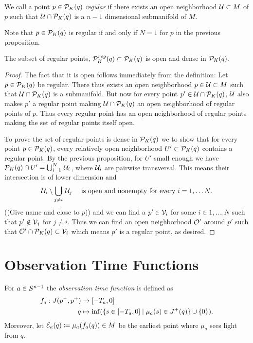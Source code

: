 \begin{definition}\label{def:regpt}
We call a point $p\in {\mathcal{P}}_K(q)$ \emph{regular} if there exists an open neighborhood ${\mathcal{U}}\subset M$ of $p$ such that ${\mathcal{U}}\cap {\mathcal{P}}_K(q)$ is a $n-1$ dimensional submanifold of $M$.

Note that $p\in {\mathcal{P}}_K(q)$ is regular if and only if $N=1$ for $p$ in the previous proposition.
\end{definition}


\begin{corollary}\label{cor:opendense}
    The subset of regular points, ${\mathcal{P}}^{reg}_K(q)\subset {\mathcal{P}}_K(q)$ is open and dense in ${\mathcal{P}}_K(q)$.
\end{corollary}
\begin{proof}
The fact that it is open follows immediately from the definition: Let $p\in {\mathcal{P}}_K(q)$ be regular. There thus exists an open neighborhood $p\in {\mathcal{U}}\subset M$ such that $\mathcal{U} \cap {\mathcal{P}}_K(q)$ is a submanifold. But now for every point $p'\in \mathcal{U}\cap{\mathcal{P}}_K(q)$, ${\mathcal{U}}$ also makes $p'$ a regular point making $\mathcal{U}\cap{\mathcal{P}}_K(q)$ an open neighborhood of regular points of $p$. Thus every regular point has an open neighborhood of regular points making the set of regular points itself open.

To prove the set of regular points is dense in ${{\mathcal{P}}_K(q)}$ we to show that for every point $p\in {\mathcal{P}}_K(q)$, every relatively open neighborhood $U'\subset{\mathcal{P}}_K(q)$ contains a regular point. By the previous proposition, for $U'$ small enough we have ${\mathcal{P}}_K(q)\cap U' = \bigcup_{i=1}^N\,\mathcal{U}_i$, where $\mathcal{U}_i$ are pairwise transversal. This means their intersection is of lower dimension and 
\[
    \mathcal{U}_i \setminus \bigcup_{j\neq i}\, \mathcal{U}_j \quad \text{ is open and nonempty for every }i=1,\dots N.
\]
((Give name and close to $p$))
and we can find a $p'\in {\mathcal{V}}_i$ for some $i\in 1,\dots,N$ such that $p'\notin {\mathcal{V}}_j$ for $j\neq i$. Thus we can find an open neighborhood ${\mathcal{O}}'$ around $p'$ such that ${\mathcal{O}}'\cap {\mathcal{P}}_K(q)\subset {\mathcal{V}}_i$ which means $p'$ is a regular point, as desired.
\end{proof}

\section{Observation Time Functions}
\begin{definition}\label{def:observationtime}
For $a\in {S^{n-1}}$ the \emph{observation time function} 
is defined as 
\begin{align*}
    f_a:J(p^-,p^+)&\to [-T_a,0]\\
    q&\mapsto\inf(\{s\in [-T_a,0] \mid \mu_a(s)\in J^+(q)\}\cup \{0\}).
\end{align*}
Moreover, let ${\mathcal{E}}_a(q)\coloneqq\mu_a(f_a(q))\in M$ be the earliest point where $\mu_a$ sees light from $q$.
\end{definition}


